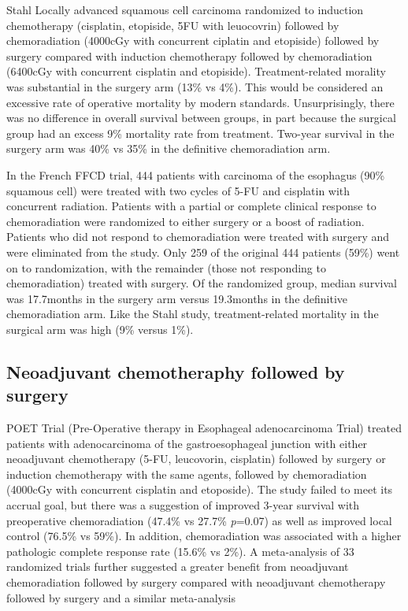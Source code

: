 \documentclass[
]{book}
\begin{document}
Stahl Locally advanced squamous cell carcinoma randomized to induction chemotherapy (cisplatin, etopiside, 5FU with leuocovrin) followed by chemoradiation (4000cGy with concurrent ciplatin and etopiside) followed by surgery compared with induction chemotherapy followed by chemoradiation (6400cGy with concurrent cisplatin and etopiside).\citep{stahl2310} Treatment-related morality was substantial in the surgery arm (13\% vs 4\%). This would be considered an excessive rate of operative mortality by modern standards. Unsurprisingly, there was no difference in overall survival between groups, in part because the surgical group had an excess 9\% mortality rate from treatment. Two-year survival in the surgery arm was 40\% vs 35\% in the definitive chemoradiation arm.

In the French FFCD trial, 444 patients with carcinoma of the esophagus (90\% squamous cell) were treated with two cycles of 5-FU and cisplatin with concurrent radiation.\citep{bedenne1160} Patients with a partial or complete clinical response to chemoradiation were randomized to either surgery or a boost of radiation. Patients who did not respond to chemoradiation were treated with surgery and were eliminated from the study. Only 259 of the original 444 patients (59\%) went on to randomization, with the remainder (those not responding to chemoradiation) treated with surgery. Of the randomized group, median survival was 17.7months in the surgery arm versus 19.3months in the definitive chemoradiation arm. Like the Stahl study, treatment-related mortality in the surgical arm was high (9\% versus 1\%).

\hypertarget{neoadjuvant-chemotheraphy-followed-by-surgery}{%
\subsection{Neoadjuvant chemotheraphy followed by surgery}\label{neoadjuvant-chemotheraphy-followed-by-surgery}}

POET Trial (Pre-Operative therapy in Esophageal adenocarcinoma Trial) treated patients with adenocarcinoma of the gastroesophageal junction with either neoadjuvant chemotherapy (5-FU, leucovorin, cisplatin) followed by surgery or induction chemotherapy with the same agents, followed by chemoradiation (4000cGy with concurrent cisplatin and etoposide). The study failed to meet its accrual goal, but there was a suggestion of improved 3-year survival with preoperative chemoradiation (47.4\% vs 27.7\% \emph{p}=0.07) as well as improved local control (76.5\% vs 59\%). In addition, chemoradiation was associated with a higher pathologic complete response rate (15.6\% vs 2\%)\citep{stahl851}. A meta-analysis of 33 randomized trials further suggested a greater benefit from neoadjuvant chemoradiation followed by surgery compared with neoadjuvant chemotherapy followed by surgery\citep{pasquali481} and a similar meta-analysis \citep{sjoquist681}
\end{document}
